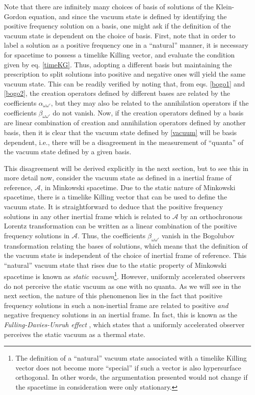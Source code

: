 \documentclass[
12pt,		%
openright,	%
twoside,  %
a4paper,			%
chapter=TITLE,		%
english,			%
french,				%
spanish,			%
brazil				%
]{USPSC-classe/USPSC}
\begin{document}
Note that there are infinitely many choices of basis of solutions of the Klein-Gordon equation, and since the vacuum state is defined by identifying the positive frequency solution on a basis, one might ask if the definition of the vacuum state is dependent on the choice of basis. First, note that in order to label a solution as a positive frequency one in a ``natural'' manner, it is necessary for spacetime to possess a timelike Killing vector, and evaluate the condition given by eq. \ref{timeKG}. Thus, adopting a different basis but maintaining the prescription to split solutions into positive and negative ones will yield the same vacuum state. This can be readily verified by noting that, from eqs. \ref{bogo1} and \ref{bogo2}, the creation operators defined by different bases are related by the coefficients $\alpha_{\omega\omega'}$, but they may also be related to the annihilation operators if the coefficients $\beta_{\omega\omega'}$ do not vanish. Now, if the creation operators defined by a basis are linear combination of creation and annihilation operators defined by another basis, then it is clear that the vacuum state defined by \ref{vacuum} will be basis dependent, i.e., there will be a disagreement in the measurement of ``quanta'' of the vacuum state defined by a given basis. 

This disagreement will be derived explicitly in the next section, but to see this in more detail now, consider the vacuum state as defined in a inertial frame of reference, $\mathscr{A}$, in Minkowski spacetime. Due to the static nature of Minkowski spacetime, there is a timelike Killing vector that can be used to define the vacuum state. It is straightforward to deduce \cite{Dowker} that the positive frequency solutions in any other inertial frame which is related to $\mathscr{A}$ by an orthochronous Lorentz transformation can be written as a linear combination of the positive frequency solutions in $\mathscr{A}$. Thus, the coefficients $\beta_{\omega\omega'}$ vanish in the Bogolubov transformation relating the bases of solutions, which means that the definition of the vacuum state is independent of the choice of inertial frame of reference. This ``natural'' vacuum state that rises due to the static property of Minkowski spacetime is known as \textit{static vacuum}\footnote{The definition of a ``natural'' vacuum state associated with a timelike Killing vector does not become more ``special'' if such a vector is also hypersurface orthogonal. In other words, the argumentation presented would not change if the spacetime in consideration were only stationary.}. However, uniformly accelerated observers do not perceive the static vacuum as one with no quanta. As we will see in the next section, the nature of this phenomenon lies in the fact that positive frequency solutions in such a non-inertial frame are related to positive \textit{and} negative frequency solutions in an inertial frame. In fact, this is known as the \textit{Fulling-Davies-Unruh effect} \cite{Crispino2007}, which states that a uniformly accelerated observer perceives the static vacuum as a thermal state. 
\end{document}
